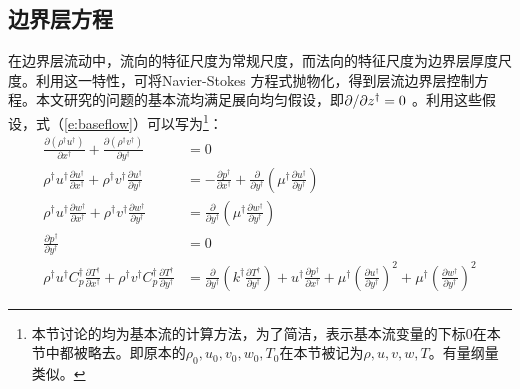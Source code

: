 \subsection{边界层方程}\label{subsec:BLfun}
在边界层流动中，流向的特征尺度为常规尺度，而法向的特征尺度为边界层厚度尺度。利用这一特性，可将Navier-Stokes 方程式抛物化，得到层流边界层控制方程。本文研究的问题的基本流均满足展向均匀假设，即${\partial}/{\partial z^\dagger}=0$ 。利用这些假设，式（\ref{e:baseflow}）可以写为\footnote{本节讨论的均为基本流的计算方法，为了简洁，表示基本流变量的下标0在本节中都被略去。即原本的$\rho_0,u_0,v_0,w_0,T_0$在本节被记为$\rho,u,v,w,T$。有量纲量类似。}：
\begin{subequations}
\begin{align}
\frac{{\partial \left( {\rho^\dagger u^\dagger} \right)}}{{\partial x^\dagger }} + \frac{{\partial \left( {\rho^\dagger v^\dagger} \right)}}{{\partial y^\dagger }} &= 0 \\
\rho ^\dagger u^\dagger \frac{{\partial u^\dagger }}{{\partial x^\dagger }} + \rho ^\dagger v^\dagger \frac{{\partial u^\dagger }}{{\partial y^\dagger }} &=  - \frac{{\partial p^\dagger }}{{\partial x^\dagger }} + \frac{\partial }{{\partial y^\dagger }}\left( {\mu ^\dagger \frac{{\partial u^\dagger }}{{\partial y^\dagger }}} \right)\\
\rho ^\dagger u^\dagger \frac{{\partial w^\dagger }}{{\partial x^\dagger }} + \rho ^\dagger v^\dagger \frac{{\partial w^\dagger }}{{\partial y^\dagger }} &= \frac{\partial }{{\partial y^\dagger }}\left( {\mu ^\dagger \frac{{\partial w^\dagger }}{{\partial y^\dagger }}} \right)\\
\frac{{\partial p^\dagger }}{{\partial y^\dagger }} &= 0\\
\rho ^\dagger u^\dagger C_p^\dagger \frac{{\partial T^\dagger }}{{\partial x^\dagger }} + \rho ^\dagger v^\dagger C_p^\dagger \frac{{\partial T^\dagger }}{{\partial y^\dagger }} &= \frac{\partial }{{\partial y^\dagger }}\left( {k^\dagger \frac{{\partial T^\dagger }}{{\partial y^\dagger }}} \right) + u^\dagger \frac{{\partial p^\dagger }}{{\partial x^\dagger }} + \mu ^\dagger \left( {\frac{{\partial u^\dagger }}{{\partial y^\dagger }}} \right)^2  + \mu ^\dagger \left( {\frac{{\partial w^\dagger }}{{\partial y^\dagger }}} \right)^2
\end{align}
\end{subequations}

